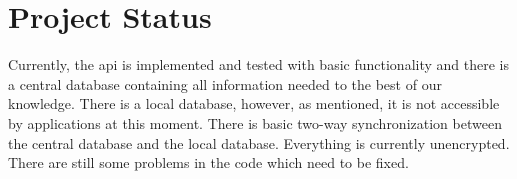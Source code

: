 \section{Project Status}

Currently, the \ac{api} is implemented and tested with basic functionality and there is a central database containing all information needed to the best of our knowledge. There is a local database, however, as mentioned, it is not accessible by applications at this moment. There is basic two-way synchronization between the central database and the local database. Everything is currently unencrypted. There are still some problems in the code which need to be fixed.  
